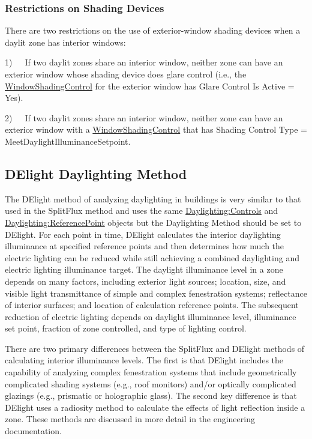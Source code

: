 \subsubsection{Restrictions on Shading Devices}\label{restrictions-on-shading-devices}

There are two restrictions on the use of exterior-window shading devices when a daylit zone has interior windows:

1)~~~If two daylit zones share an interior window, neither zone can have an exterior window whose shading device does glare control (i.e., the \hyperref[windowpropertyshadingcontrol]{WindowShadingControl} for the exterior window has Glare Control Is Active = Yes).

2)~~~If two daylit zones share an interior window, neither zone can have an exterior window with a \hyperref[windowpropertyshadingcontrol]{WindowShadingControl} that has Shading Control Type = MeetDaylightIlluminanceSetpoint.

\subsection{DElight Daylighting Method}\label{delight-daylighting-method}

The DElight method of analyzing daylighting in buildings is very similar to that used in the SplitFlux method and uses the same \hyperref[daylightingcontrols-000]{Daylighting:Controls} and \hyperref[daylightingreferencepoint-000]{Daylighting:ReferencePoint} objects but the Daylighting Method should be set to DElight. For each point in time, DElight calculates the interior daylighting illuminance at specified reference points and then determines how much the electric lighting can be reduced while still achieving a combined daylighting and electric lighting illuminance target. The daylight illuminance level in a zone depends on many factors, including exterior light sources; location, size, and visible light transmittance of simple and complex fenestration systems; reflectance of interior surfaces; and location of calculation reference points. The subsequent reduction of electric lighting depends on daylight illuminance level, illuminance set point, fraction of zone controlled, and type of lighting control.

There are two primary differences between the SplitFlux and DElight methods of calculating interior illuminance levels. The first is that DElight includes the capability of analyzing complex fenestration systems that include geometrically complicated shading systems (e.g., roof monitors) and/or optically complicated glazings (e.g., prismatic or holographic glass). The second key difference is that DElight uses a radiosity method to calculate the effects of light reflection inside a zone. These methods are discussed in more detail in the engineering documentation.

